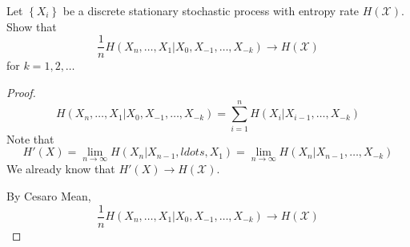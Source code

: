 \begin{exercise}{ Let $\left\{X_{i}\right\}$ be a discrete stationary stochastic process with entropy rate $H(\mathcal{X}) .$ Show that
  $$
  \frac{1}{n} H\left(X_{n}, \ldots, X_{1} | X_{0}, X_{-1}, \ldots, X_{-k}\right) \rightarrow H(\mathcal{X})
  $$
  for $k=1,2, \ldots$}
  \begin{proof}
  \begin{equation}
      H\left(X_{n}, \ldots, X_{1} | X_{0}, X_{-1}, \ldots, X_{-k}\right) = \sum_{i=1}^{n} H(X_i|X_{i-1},\ldots,X_{-k})
  \end{equation}
  Note that $$H'(X) = \lim_{n\rightarrow \infty}H(X_n|X_{n-1},ldots,X_1) = \lim_{n\rightarrow \infty}H(X_n|X_{n-1},\ldots,X_{-k})$$
  We already know that $H'(X)\rightarrow H(\mathcal{X})$.

  By Cesaro Mean, $$
  \frac{1}{n} H\left(X_{n}, \ldots, X_{1} | X_{0}, X_{-1}, \ldots, X_{-k}\right) \rightarrow H(\mathcal{X})
  $$
  \end{proof}
  \label{ex4}
\end{exercise}


